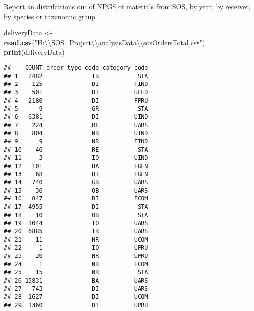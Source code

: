 \documentclass[]{article}
\newenvironment{Shaded}{\begin{snugshade}}{\end{snugshade}}
\newcommand{\KeywordTok}[1]{\textcolor[rgb]{0.13,0.29,0.53}{\textbf{{#1}}}}
\newcommand{\CharTok}[1]{\textcolor[rgb]{0.31,0.60,0.02}{{#1}}}
\newcommand{\StringTok}[1]{\textcolor[rgb]{0.31,0.60,0.02}{{#1}}}
\newcommand{\NormalTok}[1]{{#1}}
\begin{document}
Report on distributions out of NPGS of materials from SOS, by year, by
receiver, by species or taxonomic group

\begin{Shaded}
\begin{Highlighting}[]
\NormalTok{deliveryData <-}\KeywordTok{read.csv}\NormalTok{(}\StringTok{"H:}\CharTok{\textbackslash{}\textbackslash{}}\StringTok{SOS_Project}\CharTok{\textbackslash{}\textbackslash{}}\StringTok{analysisData}\CharTok{\textbackslash{}\textbackslash{}}\StringTok{sosOrdersTotal.csv"}\NormalTok{)}
\KeywordTok{print}\NormalTok{(deliveryData)}
\end{Highlighting}
\end{Shaded}

\begin{verbatim}
##    COUNT order_type_code category_code
## 1   2482              TR           STA
## 2    125              DI          FIND
## 3    501              DI          UFED
## 4   2180              DI          FPRU
## 5      9              GR           STA
## 6   6381              DI          UIND
## 7    224              RE          UARS
## 8    804              NR          UIND
## 9      9              NR          FIND
## 10    46              RE           STA
## 11     3              IO          UIND
## 12   101              BA          FGEN
## 13    68              DI          FGEN
## 14   740              GR          UARS
## 15    36              OB          UARS
## 16   847              DI          FCOM
## 17  4955              DI           STA
## 18    10              OB           STA
## 19  1044              IO          UARS
## 20  6885              TR          UARS
## 21    11              NR          UCOM
## 22     1              IO          UPRU
## 23    20              NR          UPRU
## 24     1              NR          FCOM
## 25    15              NR           STA
## 26 15831              BA          UARS
## 27   743              DI          UARS
## 28  1627              DI          UCOM
## 29  1360              DI          UPRU
\end{verbatim}
\end{document}
